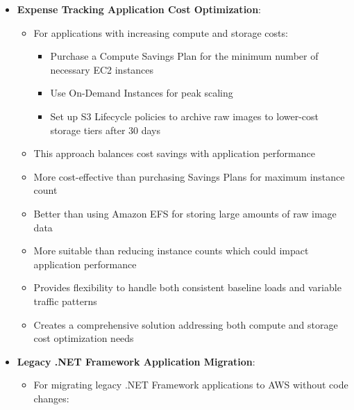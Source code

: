 \documentclass[11pt,a4paper]{report}
\begin{document}
\begin{itemize}
\begin{itemize}
\begin{itemize}
  \item Deploy an S3 gateway endpoint
\end{itemize}
  \item Ensures data travels only through the AWS private network
  \item Free to use (pay only for S3 requests and data transfer)
  \item More cost-effective than using NAT gateways
  \item Simpler than AWS Storage Gateway for basic S3 access
  \item More appropriate than S3 interface endpoints which incur additional costs
\end{itemize}
  \item \textbf{Expense Tracking Application Cost Optimization}:
\begin{itemize}
  \item For applications with increasing compute and storage costs:
\begin{itemize}
  \item Purchase a Compute Savings Plan for the minimum number of necessary EC2 instances
  \item Use On-Demand Instances for peak scaling
  \item Set up S3 Lifecycle policies to archive raw images to lower-cost storage tiers after 30 days
\end{itemize}
  \item This approach balances cost savings with application performance
  \item More cost-effective than purchasing Savings Plans for maximum instance count
  \item Better than using Amazon EFS for storing large amounts of raw image data
  \item More suitable than reducing instance counts which could impact application performance
  \item Provides flexibility to handle both consistent baseline loads and variable traffic patterns
  \item Creates a comprehensive solution addressing both compute and storage cost optimization needs
\end{itemize}
  \item \textbf{Legacy .NET Framework Application Migration}:
\begin{itemize}
  \item For migrating legacy .NET Framework applications to AWS without code changes:
\begin{itemize}

\end{itemize}
\end{itemize}
\end{itemize}
\end{document}
